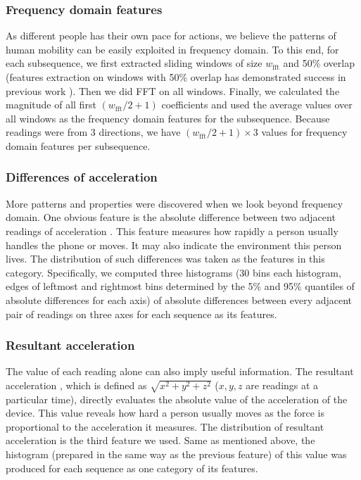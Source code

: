 \documentclass{article} %
\begin{document}
\subsubsection{Frequency domain features}
As different people has their own pace for actions, we believe the patterns of human mobility can be easily exploited in frequency domain. To this end, for each subsequence, we first extracted sliding windows of size $w_\mathrm{fft}$ and 50\% overlap (features extraction on windows with 50\% overlap has demonstrated success in previous work \cite{Bao:PC2004}). Then we did FFT on all windows. Finally, we calculated the magnitude of all first $(w_\mathrm{fft}/2 + 1)$ coefficients and used the average values over all windows as the frequency domain features for the subsequence. Because readings were from 3 directions, we have $(w_\mathrm{fft}/2 + 1)\times 3$ values for frequency domain features per subsequence.

\subsubsection{Differences of acceleration}
More patterns and properties were discovered when we look beyond frequency domain. One obvious feature is the absolute difference between two adjacent readings of acceleration \cite{Kwapisz:BTAS2009}. This feature measures how rapidly a person usually handles the phone or moves. It may also indicate the environment this person lives. The distribution of such differences was taken as the features in this category. Specifically, we computed three histograms (30 bins each histogram, edges of leftmost and rightmost bins determined by the 5\% and 95\% quantiles of absolute differences for each axis) of absolute differences between every adjacent pair of readings on three axes for each sequence as its features. 

\subsubsection{Resultant acceleration}
The value of each reading alone can also imply useful information. The resultant acceleration \cite{Kwapisz:BTAS2009}, which is defined as $\sqrt{x^2+y^2+z^2}$ ($x,y,z$ are readings at a particular time), directly evaluates the absolute value of the acceleration of the device. This value reveals how hard a person usually moves as the force is proportional to the acceleration it measures. The distribution of resultant acceleration is the third feature we used. Same as mentioned above, the histogram (prepared in the same way as the previous feature) of this value was produced for each sequence as one category of its features.
\end{document}
